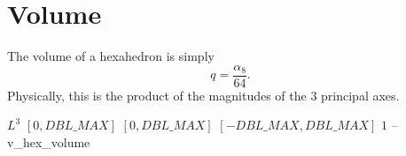 \section{Volume\label{s:hex-volume}}

The volume of a hexahedron is simply
\[
q = \frac{\alpha_8}{64}.
\]
Physically, this is the product of the magnitudes of the 3 principal axes.

%
{$L^3$}%
{$[0,DBL\_MAX]$}%
{$[0,DBL\_MAX]$}%
{$[-DBL\_MAX,DBL\_MAX]$}%
{$1$}%
{--}%
{v\_hex\_volume}%
